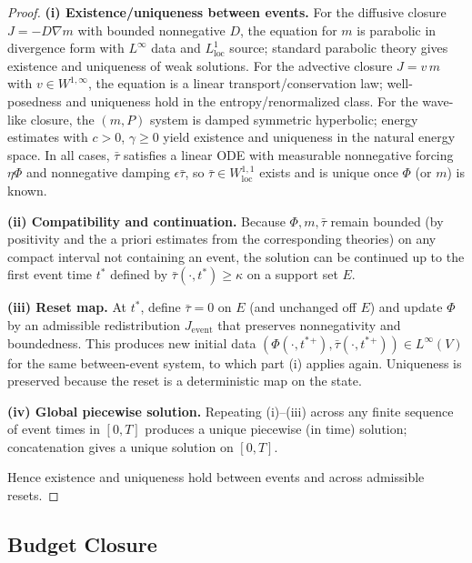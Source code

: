 \documentclass[11pt]{article}
\begin{document}
\begin{proof}
\textbf{(i) Existence/uniqueness between events.}
For the diffusive closure $J=-D\nabla m$ with bounded nonnegative $D$, the equation
for $m$ is parabolic in divergence form with $L^\infty$ data and $L^1_{\text{loc}}$ source; standard
parabolic theory gives existence and uniqueness of weak solutions. For the advective
closure $J=v\,m$ with $v\in W^{1,\infty}$, the equation is a linear transport/conservation
law; well-posedness and uniqueness hold in the entropy/renormalized class. For the
wave-like closure, the $(m,P)$ system is damped symmetric hyperbolic; energy estimates
with $c>0$, $\gamma\ge 0$ yield existence and uniqueness in the natural energy space.
In all cases, $\bar{\tau}$ satisfies a linear ODE with measurable nonnegative forcing
$\eta\Phi$ and nonnegative damping $\epsilon\bar{\tau}$, so $\bar{\tau}\in W^{1,1}_{\text{loc}}$ exists and is unique
once $\Phi$ (or $m$) is known.

\textbf{(ii) Compatibility and continuation.}
Because $\Phi,m,\bar{\tau}$ remain bounded (by positivity and the a priori estimates from
the corresponding theories) on any compact interval not containing an event, the
solution can be continued up to the first event time $t^\ast$ defined by
$\bar{\tau}(\cdot,t^\ast)\ge \kappa$ on a support set $E$.

\textbf{(iii) Reset map.}
At $t^\ast$, define $\bar{\tau}=0$ on $E$ (and unchanged off $E$) and update $\Phi$ by an
admissible redistribution $J_{\text{event}}$ that preserves nonnegativity and boundedness. This
produces new initial data $(\Phi(\cdot,t^\ast{}^+),\bar{\tau}(\cdot,t^\ast{}^+))\in L^\infty(V)$ for the same
between-event system, to which part (i) applies again. Uniqueness is preserved because
the reset is a deterministic map on the state.

\textbf{(iv) Global piecewise solution.}
Repeating (i)–(iii) across any finite sequence of event times in $[0,T]$ produces a
unique piecewise (in time) solution; concatenation gives a unique solution on $[0,T]$.

Hence existence and uniqueness hold between events and across admissible resets.
\end{proof}


\subsection{Budget Closure}
\end{document}
